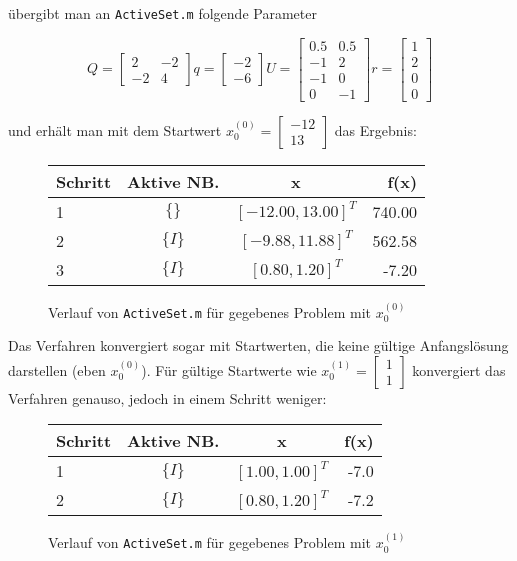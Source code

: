 \documentclass[a4paper, 12pt]{report}
\begin{document}
übergibt man an \lstinline[basicstyle=\ttfamily\color{black}]|ActiveSet.m| folgende Parameter

$$ Q = \begin{bmatrix}2 & -2\\-2 & 4\end{bmatrix} q = \begin{bmatrix}-2\\-6\end{bmatrix} U = \begin{bmatrix} 0.5 & 0.5\\-1 & 2\\-1 & 0\\0 & -1 \end{bmatrix} r = \begin{bmatrix}1\\2\\0\\0\end{bmatrix} $$

und erhält man mit dem Startwert $x_0^{(0)} = \begin{bmatrix}-12\\13\end{bmatrix}$ das Ergebnis:

\begin{figure}[H]
  \centering
  \def\arraystretch{1.25}
  \begin{tabular}{l|c|c|r}
    \hline
    \textbf{Schritt} & \textbf{Aktive NB.} & \textbf{x} & \textbf{f(x)}\\
    \hline
    1 & $\{\}$ & $[-12.00, 13.00]^T$ & 740.00\\
    2 & $\{I\}$ & $[-9.88, 11.88]^T$ & 562.58\\
    3 & $\{I\}$ & $[0.80, 1.20]^T$ & -7.20\\
    \hline
  \end{tabular}
  \caption{Verlauf von \lstinline[basicstyle=\ttfamily\color{black}]|ActiveSet.m| für gegebenes Problem mit $x_0^{(0)}$ }
\end{figure}

Das Verfahren konvergiert sogar mit Startwerten, die keine gültige Anfangslösung darstellen (eben $x_0^{(0)}$).
Für gültige Startwerte wie $x_0^{(1)} = \begin{bmatrix}1\\1\end{bmatrix}$ konvergiert das Verfahren genauso, jedoch
in einem Schritt weniger:

\begin{figure}[H]
  \centering
  \def\arraystretch{1.25}
  \begin{tabular}{l|c|c|r}
    \hline
    \textbf{Schritt} & \textbf{Aktive NB.} & \textbf{x} & \textbf{f(x)}\\
    \hline
    1 & $\{I\}$ & $[1.00, 1.00]^T$ & -7.0\\
    2 & $\{I\}$ & $[0.80, 1.20]^T$ & -7.2\\
    \hline
  \end{tabular}
  \caption{Verlauf von \lstinline[basicstyle=\ttfamily\color{black}]|ActiveSet.m| für gegebenes Problem mit $x_0^{(1)}$ }
\end{figure}
\end{document}
